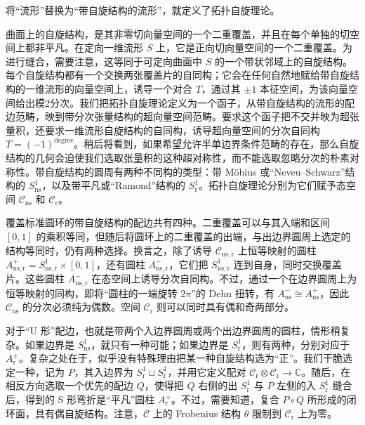\begin{example}\label{ex:2.3}
将“流形”替换为“带自旋结构的流形”，就定义了拓扑自旋理论。

曲面上的自旋结构，是其非零切向量空间的一个二重覆盖，并且在每个单独的切空间上都非平凡。在定向一维流形 $S$ 上，它是正向切向量空间的一个二重覆盖。为进行缝合，需要注意，这等同于可定向曲面中 $S$ 的一个带状邻域上的自旋结构。每个自旋结构都有一个交换两张覆盖片的自同构；它会在任何自然地赋给带自旋结构的一维流形的向量空间上，诱导一个对合 $T$，通过其 $\pm1$ 本征空间，为该向量空间给出模2分次。我们把拓扑自旋理论定义为一个函子，从带自旋结构的流形的配边范畴，映到带分次张量结构的超向量空间范畴。要求这个函子把不交并映为超张量积，还要求一维流形自旋结构的自同构，诱导超向量空间的分次自同构 $T=(-1)^{\mathrm{degree}}$。稍后将看到，如果希望允许半单边界条件范畴的存在，那么自旋结构的几何会迫使我们选取张量积的这种超对称性，而不能选取忽略分次的朴素对称性。带自旋结构的圆周有两种不同构的类型：带 Möbius 或“Neveu--Schwarz”结构的 $S^1_{\mathrm{ns}}$，以及带平凡或“Ramond”结构的 $S^1_{\mathrm{r}}$。拓扑自旋理论分别为它们赋予态空间 $\mathcal{C}_{\mathrm{ns}}$ 和 $\mathcal{C}_{\mathrm{r}}$。

覆盖标准圆环的带自旋结构的配边共有四种。二重覆盖可以与其入端和区间 $[0,1]$ 的乘积等同，但随后将圆环上的二重覆盖的出端，与出边界圆周上选定的结构等同时，仍有两种选择。换言之，除了诱导 $\mathcal{C}_{\mathrm{ns},\mathrm{r}}$ 上恒等映射的圆柱 $A^+_{\mathrm{ns},\mathrm{r}}=S^1_{\mathrm{ns},\mathrm{r}}\times[0,1]$，还有圆柱 $A^-_{\mathrm{ns},\mathrm{r}}$，它们把 $S^1_{\mathrm{ns},\mathrm{r}}$ 连到自身，同时交换覆盖片。这些圆柱 $A^-_{\mathrm{ns},\mathrm{r}}$ 在态空间上诱导分次自同构。不过，通过一个在边界圆周上为恒等映射的同构，即将“圆柱的一端旋转 $2\pi$”的 Dehn 扭转，有 $A^-_{\mathrm{ns}}\cong A^+_{\mathrm{ns}}$，因此 $\mathcal{C}_{\mathrm{ns}}$ 的分次必须纯为偶数。空间 $\mathcal{C}_{\mathrm{r}}$ 则可以同时具有偶和奇两部分。

对于“U 形”配边，也就是带两个入边界圆周或两个出边界圆周的圆柱，情形稍复杂。如果边界是 $S^1_{\mathrm{ns}}$，就只有一种可能；如果边界是 $S^1_{\mathrm{r}}$，则有两种，分别对应于 $A^\pm_{\mathrm{r}}$。复杂之处在于，似乎没有特殊理由把某一种自旋结构选为“正”。我们干脆选定一种，记为 $P$，其入边界为 $S^1_{\mathrm{r}}\sqcup S^1_{\mathrm{r}}$，并用它定义配对 $\mathcal{C}_{\mathrm{r}}\otimes\mathcal{C}_{\mathrm{r}}\to\mathbb{C}$。随后，在相反方向选取一个优先的配边 $Q$，使得把 $Q$ 右侧的出 $S^1_{\mathrm{r}}$ 与 $P$ 左侧的入 $S^1_{\mathrm{r}}$ 缝合后，得到的 S 形弯折是“平凡”圆柱 $A^+_{\mathrm{r}}$。不过，需要知道，复合 $P\circ Q$ 所形成的闭环面，具有偶自旋结构。注意，$\mathcal{C}$ 上的 Frobenius 结构 $\theta$ 限制到 $\mathcal{C}_{\mathrm{r}}$ 上为零。


\end{example}
